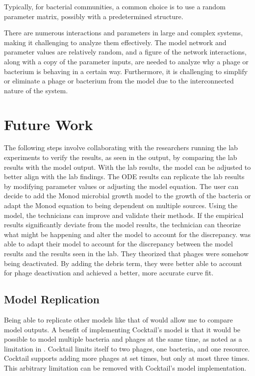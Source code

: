 Typically, for bacterial communities, a common choice is to use a random parameter matrix, possibly with a predetermined structure. 

There are numerous interactions and parameters in large and complex systems, making it challenging to analyze them effectively. 
The model network and parameter values are relatively random, and a figure of the network interactions, along with a copy of the parameter inputs, are needed to analyze why a phage or bacterium is behaving in a certain way. 
Furthermore, it is challenging to simplify or eliminate a phage or bacterium from the model due to the interconnected nature of the system. 

\section{Future Work}
\label{Future Work}
The following steps involve collaborating with the researchers running the lab experiments to verify the results, as seen in the output, by comparing the lab results with the model output. 
With the lab results, the model can be adjusted to better align with the lab findings. 
The ODE results can replicate the lab results by modifying parameter values or adjusting the model equation. 
The user can decide to add the Monod microbial growth model to the growth of the bacteria or adapt the Monod equation to being dependent on multiple sources. 
Using the model, the technicians can improve and validate their methods. 
If the empirical results significantly deviate from the model results, the technician can theorize what might be happening and alter the model to account for the discrepancy. 
\citet{deyEmergentHigherorderInteractions2025} was able to adapt their model to account for the discrepancy between the model results and the results seen in the lab. 
They theorized that phages were somehow being deactivated. 
By adding the debris term, they were better able to account for phage deactivation and achieved a better, more accurate curve fit. 

\subsection{Model Replication}
Being able to replicate other models like that of \citet{nilssonCocktailComputerProgram2022} would allow me to compare model outputs. 
A benefit of implementing Cocktail’s model is that it would be possible to model multiple bacteria and phages at the same time, as noted as a limitation in . 
Cocktail limits itself to two phages, one bacteria, and one resource. 
Cocktail supports adding more phages at set times, but only at most three times. 
This arbitrary limitation can be removed with Cocktail’s model implementation. 

